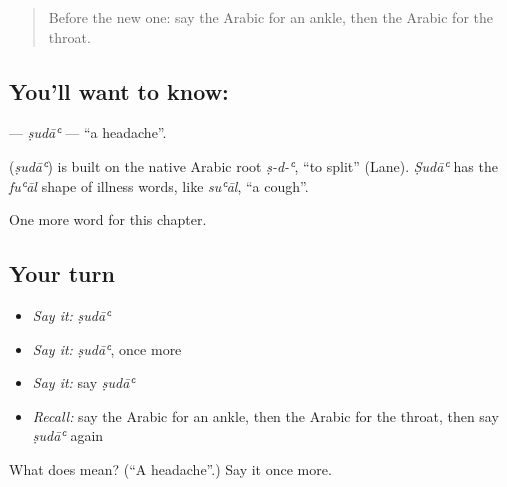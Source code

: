 \label{lesson:AR-C168-suda}



\begin{quote}
Before the new one: say the Arabic for an ankle, then the Arabic for the throat.
\end{quote}

\subsection*{You'll want to know: }
\textbf{} — \emph{ṣudāʿ} — \textquotedblleft{}a headache\textquotedblright{}.

\begin{cousinweb}
\textbf{} (\emph{ṣudāʿ}) is built on the native Arabic root \emph{ṣ-d-ʿ}, \textquotedblleft{}to split\textquotedblright{} (Lane). \emph{Ṣudāʿ} has the \emph{fuʿāl} shape of illness words, like \emph{suʿāl}, \textquotedblleft{}a cough\textquotedblright{}.
\end{cousinweb}

\begin{grammarlens}[title={What you've built}]
One more word for this chapter.
\end{grammarlens}

\subsection*{Your turn}
\begin{itemize}
\raggedright
  \item \emph{Say it:} \emph{ṣudāʿ}
  \item \emph{Say it:} \emph{ṣudāʿ}, once more
  \item \emph{Say it:} say \emph{ṣudāʿ}
  \item \emph{Recall:} say the Arabic for an ankle, then the Arabic for the throat, then say \emph{ṣudāʿ} again
\end{itemize}

\begin{tcolorbox}[breakable,colback=teal!4,colframe=teal!35!black,title={Before you move on}]
What does  mean? (\textquotedblleft{}A headache\textquotedblright{}.) Say it once more.
\end{tcolorbox}

